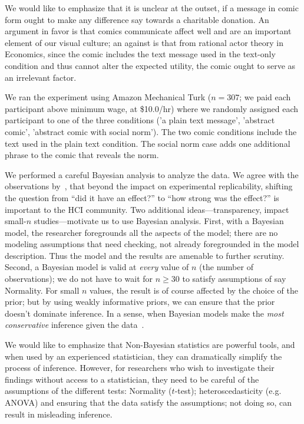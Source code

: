 We would like to emphasize that it is unclear at the outset, if a message in comic form ought to make any difference say towards a charitable donation. An argument in favor is that comics communicate affect well and are an important element of our visual culture; an against is that from rational actor theory in Economics, since the comic includes the text message used in the text-only condition and thus cannot alter the expected utility, the comic ought to serve as an irrelevant factor. 

We ran the experiment using Amazon Mechanical Turk ($n=307$; we paid each participant above minimum wage, at \$10.0/hr) where we randomly assigned each participant to one of the three conditions ('a plain text message', 'abstract comic', 'abstract comic with social norm'). The two comic conditions include the text used in the plain text condition. The social norm case adds one additional phrase to the comic that reveals the norm.

We performed a careful Bayesian analysis to analyze the data. We agree with the observations by~\textcite{Kay2016}, that beyond the impact on experimental replicability, shifting the question from ``did it have an effect?'' to ``how strong was the effect?'' is important to the HCI community. Two additional ideas---transparency, impact small-$n$ studies---motivate us to use Bayesian analysis. First, with a Bayesian model, the researcher foregrounds all the aspects of the model; there are no modeling assumptions that need checking, not already foregrounded in the model description. Thus the model and the results are amenable to further scrutiny. Second, a Bayesian model is valid at \textit{every} value of $n$ (the number of observations); we do not have to wait for $n\geq 30$ to satisfy assumptions of say Normality. For small $n$ values, the result is of course affected by the choice of the prior; but by using weakly informative priors, we can ensure that the prior doesn't dominate inference. In a sense, when Bayesian models make the \textit{most conservative} inference given the data~\textcite[][Chapter 9]{McElreath2015}.

We would like to emphasize that Non-Bayesian statistics are powerful tools, and when used by an experienced statistician, they can dramatically simplify the process of inference. However, for researchers who wish to investigate their findings without access to a statistician, they need to be careful of the assumptions of the different tests: Normality ($t$-test); heteroscedasticity (e.g. ANOVA) and ensuring that the data satisfy the assumptions; not doing so, can result in misleading inference.


